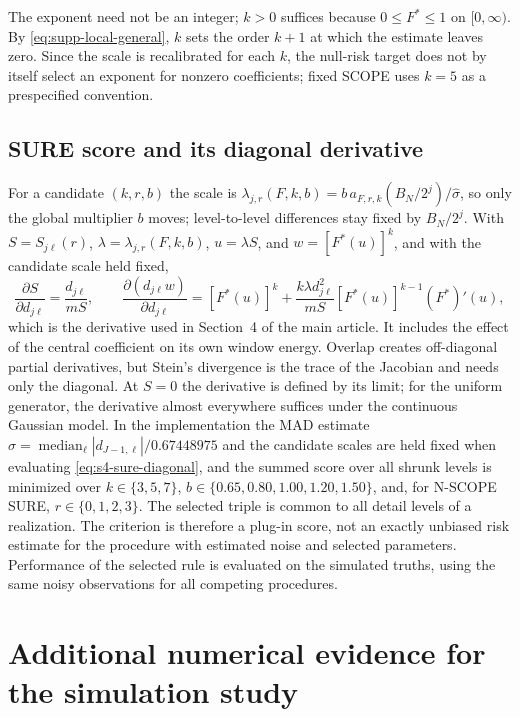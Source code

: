 \documentclass[11pt]{article}
\numberwithin{equation}{section}
\DeclareMathOperator{\median}{median}
\begin{document}
The exponent need not be an integer; $k>0$ suffices because $0\le F^*\le1$ on $[0,\infty)$. By \eqref{eq:supp-local-general}, $k$ sets the order $k+1$ at which the estimate leaves zero. Since the scale is recalibrated for each $k$, the null-risk target does not by itself select an exponent for nonzero coefficients; fixed SCOPE uses $k=5$ as a prespecified convention.

\subsection{SURE score and its diagonal derivative}
\label{sec:s4-sure}
For a candidate $(k,r,b)$ the scale is $\lambda_{j,r}(F,k,b)=b\,a_{F,r,k}(B_N/2^j)/\widehat\sigma$, so only the global multiplier $b$ moves; level-to-level differences stay fixed by $B_N/2^j$. With $S=S_{j\ell}(r)$, $\lambda=\lambda_{j,r}(F,k,b)$, $u=\lambda S$, and $w=[F^*(u)]^k$, and with the candidate scale held fixed,
\begin{equation}
\frac{\partial S}{\partial d_{j\ell}}=\frac{d_{j\ell}}{mS},\qquad
\frac{\partial(d_{j\ell}w)}{\partial d_{j\ell}}
=[F^*(u)]^k+\frac{k\lambda d_{j\ell}^2}{mS}[F^*(u)]^{k-1}(F^*)'(u),
\label{eq:s4-sure-diagonal}
\end{equation}
which is the derivative used in Section~4 of the main article. It includes the effect of the central coefficient on its own window energy. Overlap creates off-diagonal partial derivatives, but Stein's divergence is the trace of the Jacobian and needs only the diagonal. At $S=0$ the derivative is defined by its limit; for the uniform generator, the derivative almost everywhere suffices under the continuous Gaussian model. In the implementation the MAD estimate $\widehat\sigma=\median_\ell|d_{J-1,\ell}|/0.67448975$ and the candidate scales are held fixed when evaluating \eqref{eq:s4-sure-diagonal}, and the summed score over all shrunk levels is minimized over $k\in\{3,5,7\}$, $b\in\{0.65,0.80,1.00,1.20,1.50\}$, and, for N-SCOPE SURE, $r\in\{0,1,2,3\}$. The selected triple is common to all detail levels of a realization. The criterion is therefore a plug-in score, not an exactly unbiased risk estimate for the procedure with estimated noise and selected parameters. Performance of the selected rule is evaluated on the simulated truths, using the same noisy observations for all competing procedures.

\section{Additional numerical evidence for the simulation study}
\label{sec:supp-simul}
\end{document}

